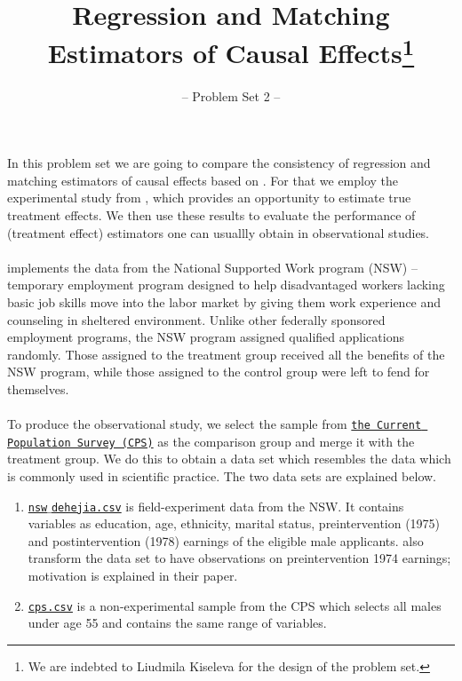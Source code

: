 

\title{Regression and Matching Estimators of Causal Effects\thanks{We are indebted to Liudmila Kiseleva for the design of the problem set.}}
\subtitle{-- Problem Set 2 --}
\date{}

\maketitle\vspace{-2cm}

In this problem set we are going to compare the consistency of regression and matching estimators of causal effects based on \cite{Dehejia.1999}. For that we employ the experimental study from \cite{LaLonde.1986}, which provides an opportunity to estimate true treatment effects. We then use these results to evaluate the performance of (treatment effect) estimators one can usuallly obtain in observational studies. \\
\\
\cite{LaLonde.1986} implements the data from the National Supported Work program (NSW) -- temporary employment program designed to help disadvantaged workers lacking basic job skills move into the labor market by giving them work experience and counseling in sheltered environment. Unlike other federally sponsored employment programs, the NSW program assigned qualified applications randomly. Those assigned to the treatment group received all the benefits of the NSW program, while those assigned to the control group were left to fend for themselves.\\
\\
To produce the observational study, we select the sample from \href{https://www.census.gov/programs-surveys/cps.html}{\texttt{the Current Population Survey (CPS)}} as the comparison group and merge it with the treatment group.
We do this to obtain a data set which resembles the data which is commonly used in scientific practice.
The two data sets are explained below.

\begin{enumerate}
 
\item \href{https://github.com/HumanCapitalAnalysis/microeconometrics/tree/master/problem-sets/02-matching-estimators/data}{\texttt{nsw$\_$dehejia.csv}} is field-experiment data from the NSW.  It contains variables as education, age, ethnicity, marital status, preintervention (1975) and postintervention (1978) earnings of the eligible male applicants. \cite{Dehejia.1999} also transform the \cite{LaLonde.1986} data set to have observations on preintervention 1974 earnings; motivation is explained in their paper.

\item \href{https://github.com/HumanCapitalAnalysis/microeconometrics/tree/master/problem-sets/02-matching-estimators/data}{\texttt{cps.csv}} is a non-experimental sample from the CPS which selects all males under age 55 and contains the same range of variables.

\end {enumerate}


